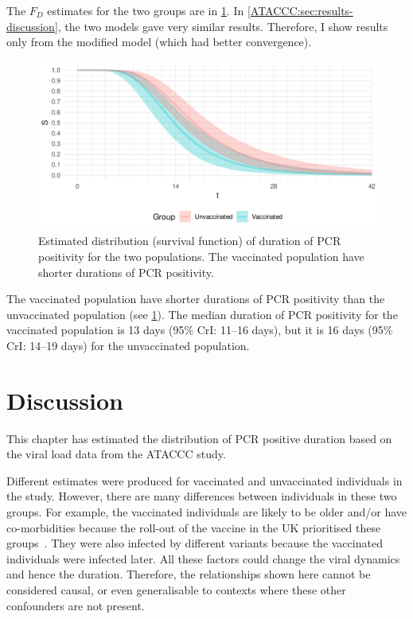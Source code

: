\documentclass[thesis.tex]{subfiles}
\begin{document}
The $F_D$ estimates for the two groups are in \cref{ATACCC:fig:duration}.
In \cref{ATACCC:sec:results-discussion}, the two models gave very similar results.
Therefore, I show results only from the modified model (which had better convergence).
\begin{figure}
  \centering \includegraphics{ATACCC/duration}
  \caption[Duration of PCR positivity.]{Estimated distribution (survival function) of duration of PCR positivity for the two populations. The vaccinated population have shorter durations of PCR positivity.  \label{ATACCC:fig:duration}}
\end{figure}

The vaccinated population have shorter durations of PCR positivity than the unvaccinated population (see \cref{ATACCC:fig:duration}).
The median duration of PCR positivity for the vaccinated population is 13 days (95\% CrI: 11--16 days), but it is 16 days (95\% CrI: 14--19 days) for the unvaccinated population.


\section{Discussion}

This chapter has estimated the distribution of PCR positive duration based on the viral load data from the ATACCC study.

Different estimates were produced for vaccinated and unvaccinated individuals in the study.
However, there are many differences between individuals in these two groups.
For example, the vaccinated individuals are likely to be older and/or have co-morbidities because the roll-out of the vaccine in the UK prioritised these groups~\autocite{naoCovidVaccination}.
They were also infected by different variants because the vaccinated individuals were infected later.
All these factors could change the viral dynamics~\autocite{russellWithinhost} and hence the duration.
Therefore, the relationships shown here cannot be considered causal, or even generalisable to contexts where these other confounders are not present.
\end{document}
